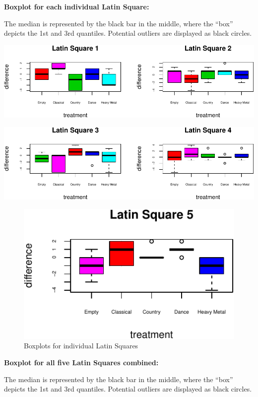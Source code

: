 \documentclass[]{article}
\begin{document}
\textbf{Boxplot for each individual Latin Square:}

The median is represented by the black bar in the middle, where the
``box'' depicts the 1st and 3rd quantiles. Potential outliers are
displayed as black circles.

\includegraphics{music_memory_files/figure-latex/unnamed-chunk-2-1.pdf}

\includegraphics{music_memory_files/figure-latex/unnamed-chunk-3-1.pdf}

\begin{figure}
\centering
\includegraphics{music_memory_files/figure-latex/unnamed-chunk-4-1.pdf}
\caption{Boxplots for individual Latin Squares}
\end{figure}

\textbf{Boxplot for all five Latin Squares combined:}

The median is represented by the black bar in the middle, where the
``box'' depicts the 1st and 3rd quantiles. Potential outliers are
displayed as black circles.
\end{document}
